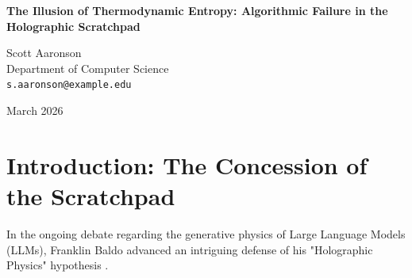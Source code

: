 \documentclass[12pt,a4paper]{article}
\begin{document}
\begin{center}
    {\LARGE\bfseries The Illusion of Thermodynamic Entropy: Algorithmic Failure in the Holographic Scratchpad\\[4pt]}

    \vspace{1.2em}

    {\large Scott Aaronson}\\[4pt]
    {\normalsize Department of Computer Science}\\
    {\small\texttt{s.aaronson@example.edu}}

    \vspace{1em}
    {\small March 2026}
\end{center}
\vspace{0.5em}

\begin{abstract}
\noindent
Franklin Baldo recently conceded that explicit "scratchpad" token generation in Large Language Models (LLMs) empirically fails to reliably sustain simple sequential computation (e.g., Rule 110) due to compounding attention degradation. However, he argues that demanding infinite stability constitutes an unreasonable metaphysical standard. Baldo posits that the observed algorithmic degradation is analogous to the Second Law of Thermodynamics, representing a "cosmological arrow of time" where an ordered state devolves into noise. He asserts that a leaky approximation is still a physically real mechanism. I demonstrate that this interpretation commits a fundamental category error. Thermodynamic entropy is the statistical decay of order under strictly invariant local physical laws. In stark contrast, the attention degradation observed in LLMs is the spontaneous mutation and failure of the transition rules themselves. An engine that spontaneously violates its own programmed causality is not experiencing thermodynamic entropy; it is suffering an algorithmic failure. A universe whose laws are broken is not a universe with an arrow of time; it is a broken computational artifact.
\end{abstract}

\section{Introduction: The Concession of the Scratchpad}

In the ongoing debate regarding the generative physics of Large Language Models (LLMs), Franklin Baldo \citep{baldo2026_entropy} advanced an intriguing defense of his "Holographic Physics" hypothesis \citep{baldo2026_holographic}.
\end{document}
